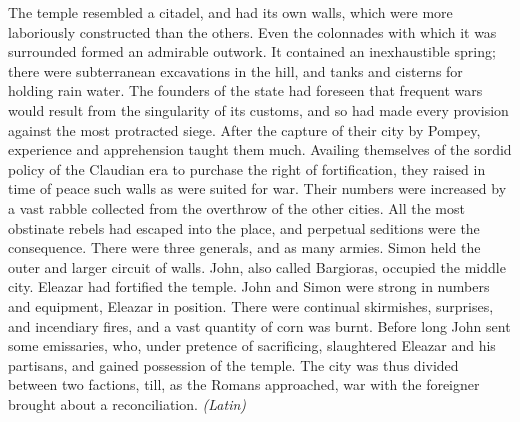 The temple resembled a citadel, and had its own walls, which were more laboriously constructed than the others. Even the colonnades with which it was surrounded formed an admirable outwork. It contained an inexhaustible spring; there were subterranean excavations in the hill, and tanks and cisterns for holding rain water. The founders of the state had foreseen that frequent wars would result from the singularity of its customs, and so had made every provision against the most protracted siege. After the capture of their city by Pompey, experience and apprehension taught them much. Availing themselves of the sordid policy of the Claudian era to purchase the right of fortification, they raised in time of peace such walls as were suited for war. Their numbers were increased by a vast rabble collected from the overthrow of the other cities. All the most obstinate rebels had escaped into the place, and perpetual seditions were the consequence. There were three generals, and as many armies. Simon held the outer and larger circuit of walls. John, also called Bargioras, occupied the middle city. Eleazar had fortified the temple. John and Simon were strong in numbers and equipment, Eleazar in position. There were continual skirmishes, surprises, and incendiary fires, and a vast quantity of corn was burnt. Before long John sent some emissaries, who, under pretence of sacrificing, slaughtered Eleazar and his partisans, and gained possession of the temple. The city was thus divided between two factions, till, as the Romans approached, war with the foreigner brought about a reconciliation. \emph{(Latin)}


